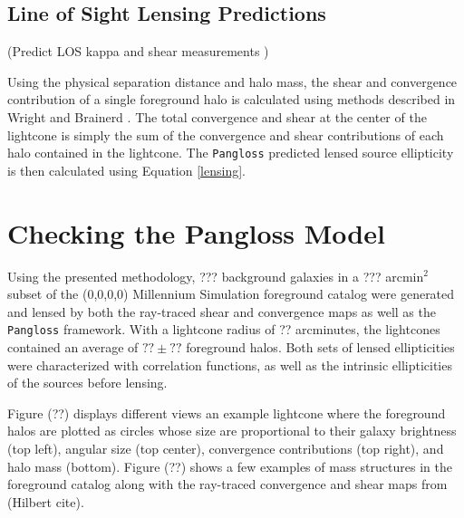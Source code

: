 \documentclass[%
 reprint,
 amsmath,amssymb,
 aps,nofootinbib
]{revtex4-1}
\begin{document}
\subsection{Line of Sight Lensing Predictions}

(Predict LOS kappa and shear measurements )

Using the physical separation distance and halo mass, the shear and convergence contribution of a single foreground halo is calculated using methods described in Wright and Brainerd \cite{lensing_calc}. The total convergence and shear at the center of the lightcone is simply the sum of the convergence and shear contributions of each halo contained in the lightcone. The \texttt{Pangloss} predicted lensed source ellipticity is then calculated using Equation \eqref{lensing}.

\section{Checking the Pangloss Model}


Using the presented methodology, ??? background galaxies in a ??? arcmin$^2$ subset of the (0,0,0,0) Millennium Simulation foreground catalog were generated and lensed by both the ray-traced shear and convergence maps as well as the \texttt{Pangloss} framework. With a lightcone radius of ?? arcminutes, the lightcones contained an average of ${??\pm??}$ foreground halos. Both sets of lensed ellipticities were characterized with correlation functions, as well as the intrinsic ellipticities of the sources before lensing.

Figure (??) displays different views an example lightcone where the foreground halos are plotted as circles whose size are proportional to their galaxy brightness (top left), angular size (top center), convergence contributions (top right), and halo mass (bottom). Figure (??) shows a few examples of mass structures in the foreground catalog along with the ray-traced convergence and shear maps from (Hilbert cite). 
\end{document}
